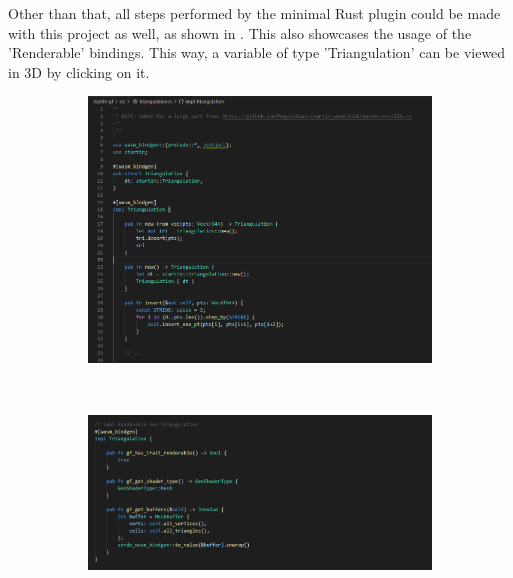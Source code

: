 Other than that, all steps performed by the minimal Rust plugin could be made with this project as well, as shown in . 
This also showcases the usage of the 'Renderable' bindings. 
This way, a variable of type 'Triangulation' can be viewed in 3D by clicking on it.

\begin{figure}
  \centering
  \begin{subfigure}[b]{\linewidth}
    \graphicspath{{../../assets/images/6.1.2}}
    \centering
    \includegraphics[width=\linewidth]{1.PNG}
  \end{subfigure}%
  \\ 
  \begin{subfigure}[b]{\linewidth}
    \graphicspath{{../../assets/images/6.1.2}}
    \centering
    \includegraphics[width=\linewidth]{5.PNG}
  \end{subfigure}%
  \\
  \begin{subfigure}[b]{\linewidth}

\end{subfigure}
\end{figure}
